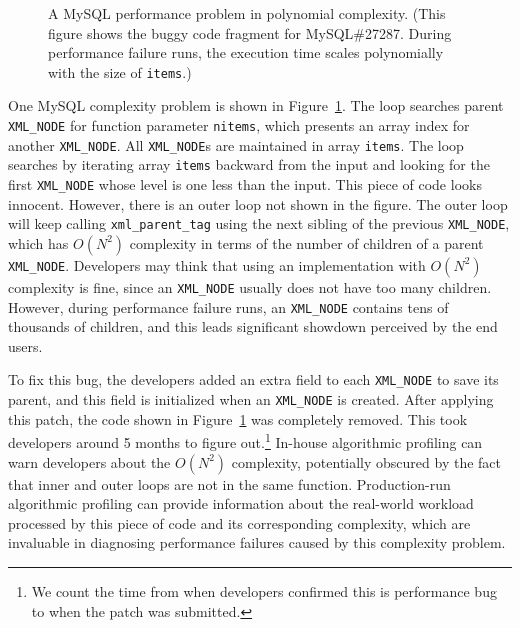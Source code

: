 \begin{figure}
\centering
{}
  \mbox{}
  \vspace{-0.1in}
\caption{A MySQL performance problem in polynomial complexity. 
\footnotesize{(This figure shows the buggy code fragment for MySQL\#27287. 
   During performance failure runs, 
   the execution time scales polynomially with the size of \texttt{items}.)}}
\vspace{-0.05in}
\label{fig:mysql27287}
\vspace{-0.15in}
\end{figure}


One MySQL complexity problem is shown in Figure~\ref{fig:mysql27287}.
The loop searches parent \texttt{XML\_NODE} for function parameter \texttt{nitems}, 
which presents an array index for another \texttt{XML\_NODE}.
All \texttt{XML\_NODE}s are maintained in array \texttt{items}. 
The loop searches by iterating array \texttt{items} 
backward from the input and looking for the first \texttt{XML\_NODE} 
whose level is one less than the input.
This piece of code looks innocent. 
However, there is an outer loop not shown in the figure.
The outer loop will keep calling \texttt{xml\_parent\_tag} using 
the next sibling of the previous \texttt{XML\_NODE}, 
which has $O(N^2)$ complexity in terms of the number of children of a parent \texttt{XML\_NODE}. 
Developers may think that using an implementation with $O(N^2)$ complexity is fine, 
since an \texttt{XML\_NODE} usually does not have too many children.
However, during performance failure runs, 
an \texttt{XML\_NODE} contains tens of thousands of children, 
and this leads significant showdown perceived by the end users. 

To fix this bug, the developers added an extra field to each \texttt{XML\_NODE} to save its parent, 
and this field is initialized when an \texttt{XML\_NODE} is created. 
After applying this patch, the code shown in Figure~\ref{fig:mysql27287} was completely removed.
This took developers around 5 months to figure 
out.\footnote{We count the time from when developers confirmed this is performance bug 
to when the patch was submitted.} 
In-house algorithmic profiling can warn developers about the $O(N^2)$ complexity, 
potentially obscured by the fact that inner and outer loops are not in the same function. 
Production-run algorithmic profiling can provide information about the real-world workload 
processed by this piece of code and its corresponding complexity,
which are invaluable in diagnosing performance failures caused by this complexity problem. 


